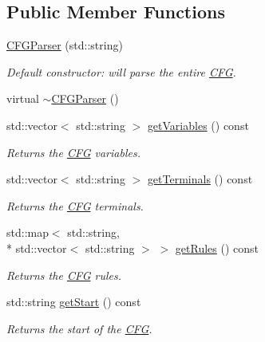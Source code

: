 \subsection*{Public Member Functions}
\begin{DoxyCompactItemize}
\item 
\hyperlink{classCFGParser_ab92c03dd2a8d901fb38b468c97ee879d}{C\-F\-G\-Parser} (std\-::string)
\begin{DoxyCompactList}\small\item\em Default constructor\-: will parse the entire \hyperlink{classCFG}{C\-F\-G}. \end{DoxyCompactList}\item 
virtual \hyperlink{classCFGParser_a52b7730ad87bfb47fcc100dc6b2756ee}{$\sim$\-C\-F\-G\-Parser} ()
\item 
std\-::vector$<$ std\-::string $>$ \hyperlink{classCFGParser_a91c3dfa2ce514b1066eb4d86af311804}{get\-Variables} () const 
\begin{DoxyCompactList}\small\item\em Returns the \hyperlink{classCFG}{C\-F\-G} variables. \end{DoxyCompactList}\item 
std\-::vector$<$ std\-::string $>$ \hyperlink{classCFGParser_aef1d5758fe648f2ab93220816bdd9a84}{get\-Terminals} () const 
\begin{DoxyCompactList}\small\item\em Returns the \hyperlink{classCFG}{C\-F\-G} terminals. \end{DoxyCompactList}\item 
std\-::map$<$ std\-::string, \\*
std\-::vector$<$ std\-::string $>$ $>$ \hyperlink{classCFGParser_abf6237f25b52dd05009220a8d10c3449}{get\-Rules} () const 
\begin{DoxyCompactList}\small\item\em Returns the \hyperlink{classCFG}{C\-F\-G} rules. \end{DoxyCompactList}\item 
std\-::string \hyperlink{classCFGParser_af4336389c220320c7d9511fffafddfae}{get\-Start} () const 
\begin{DoxyCompactList}\small\item\em Returns the start of the \hyperlink{classCFG}{C\-F\-G}. \end{DoxyCompactList}\end{DoxyCompactItemize}
